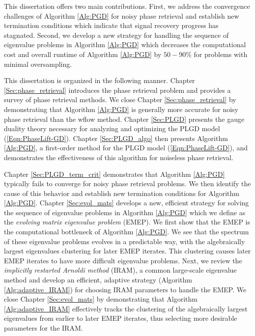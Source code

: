 This dissertation offers two main contributions.  
First, we address the convergence challenges of Algorithm \ref{Alg:PGD} for noisy phase retrieval and establish new termination conditions which indicate that signal recovery progress has stagnated.  
Second, we develop a new strategy for handling the sequence of eigenvalue problems in Algorithm \ref{Alg:PGD} which decreases the computational cost and overall runtime of Algorithm \ref{Alg:PGD} by $50-90\%$ for problems with minimal oversampling.


This dissertation is organized in the following manner.  
Chapter \ref{Sec:phase_retrieval} introduces the phase retrieval problem and provides a survey of phase retrieval methods.  
We close Chapter \ref{Sec:phase_retrieval} by demonstrating that Algorithm \ref{Alg:PGD} is generally more accurate for noisy phase retrieval than the wflow method.
Chapter \ref{Sec:PLGD} presents the gauge duality theory necessary for analyzing and optimizing the PLGD model (\ref{Eqn:PhaseLift-GD}).
Chapter \ref{Sec:PLGD_algo} then presents Algorithm \ref{Alg:PGD}, a first-order method for the PLGD model (\ref{Eqn:PhaseLift-GD}), and demonstrates the effectiveness of this algorithm for noiseless phase retrieval.

Chapter \ref{Sec:PLGD_term_crit} demonstrates that Algorithm \ref{Alg:PGD} typically fails to converge for noisy phase retrieval problems. 
We then identify the cause of this behavior and establish new termination conditions for Algorithm \ref{Alg:PGD}.
Chapter \ref{Sec:evol_mats} develops a new, efficient strategy for solving the sequence of eigenvalue problems in Algorithm \ref{Alg:PGD} which we define as the \textit{evolving matrix eigenvalue problem} (EMEP).
We first show that the EMEP is the computational bottleneck of Algorithm \ref{Alg:PGD}.
We see that the spectrum of these eigenvalue problems evolves in a predictable way, with the algebraically largest eigenvalues clustering for later EMEP iterates.
This clustering causes later EMEP iterates to have more difficult eigenvalue problems.
Next, we review the \textit{implicitly restarted Arnoldi method} (IRAM), a common large-scale eigenvalue method and develop an efficient, adaptive strategy (Algorithm \ref{Alg:adaptive_IRAM}) for choosing IRAM parameters to handle the EMEP.
We close Chapter \ref{Sec:evol_mats} by demonstrating that Algorithm \ref{Alg:adaptive_IRAM} effectively tracks the clustering of the algebraically largest eigenvalues from earlier to later EMEP iterates, thus selecting more desirable parameters for the IRAM.


